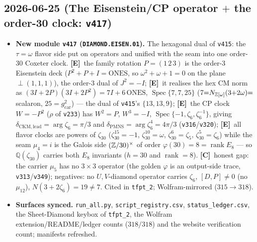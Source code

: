 \documentclass[11pt]{article}
\providecommand{\mE}{\textbf{[E]}}\providecommand{\mC}{\textbf{[C]}}
\providecommand{\vref}[1]{\texttt{#1}}
\providecommand{\gcar}{g_{\mathrm{car}}}\providecommand{\Nfam}{N_{\mathrm{fam}}}
\begin{document}
\subsection*{2026-06-25 (The Eisenstein/CP operator $+$ the order-30 clock: \texttt{v417})}
\begin{itemize}
\item \textbf{New module \texttt{v417} (\texttt{DIAMOND.EISEN.01}).} The hexagonal dual of \vref{v415}:
the $\tau{=}\omega$ flavor side put on operators and unified with the seam into one order-$30$ Coxeter
clock. \mE\ the family rotation $P=(1\,2\,3)$ is the order-$3$ Eisenstein deck ($P^2{+}P{+}I=\mathrm{ONES}$,
so $\omega^2{+}\omega{+}1{=}0$ on the plane $\perp(1,1,1)$), the order-$3$ dual of $J^2{=}{-}I$; \mE\ it
realises the hex CM norm as $(3I{+}2P)(3I{+}2P^2)=7I{+}6\,\mathrm{ONES}$, $\operatorname{Spec}\{7,7,25\}$
($7{=}N_{\mathbb{Z}[\omega]}(3{+}2\omega){=}$ scalaron, $25{=}\gcar^2$) --- the dual of \vref{v415}'s
$\{13,13,9\}$; \mE\ the CP clock $W{=}{-}P^2$ ($\rho$ of \vref{v233}) has $W^2{=}P$, $W^3{=}{-}I$,
$\operatorname{Spec}\{-1,\zeta_6,\zeta_6^{-1}\}$, giving $\delta_{\mathrm{CKM,lead}}{=}\arg\zeta_6{=}\pi/3$
and $\delta_{\mathrm{PMNS}}{=}\arg\zeta_6^4{=}4\pi/3$ (\vref{v316}/\vref{v320}); \mE\ all flavor clocks are
powers of $\zeta_{30}$ ($\zeta_{30}^{15}{=}{-}1$, $\zeta_{30}^{10}{=}\omega$, $\zeta_{30}^{6}{=}\zeta_5$,
$\zeta_{30}^{5}{=}\zeta_6$) while the seam $\mu_4{=}i$ is the Galois side $(\mathbb{Z}/30)^\times$ of order
$\varphi(30){=}8{=}\operatorname{rank}E_8$ --- so $\mathbb Q(\zeta_{30})$ carries both $E_8$ invariants
($h{=}30$ and $\operatorname{rank}{=}8$). \mC\ honest gap: the carrier $\mu_5$ has no $3{\times}3$
operator (the golden $\varphi$ is an output-side trace, \vref{v313}/\vref{v349}); negatives: no
$U,V$-diamond operator carries $\zeta_6$, $[D,P]\neq0$ (no $\mu_{12}$), $N(3{+}2\zeta_6){=}19{\neq}7$.
Cited in \texttt{tfpt\_2}; Wolfram-mirrored ($315\to318$).
\item \textbf{Surfaces synced.} \texttt{run\_all.py}, \texttt{script\_registry.csv},
\texttt{status\_ledger.csv}, the Sheet-Diamond keybox of \texttt{tfpt\_2}, the Wolfram
extension/README/ledger counts ($318/318$) and the website verification count; manifests refreshed.
\end{itemize}
\end{document}
